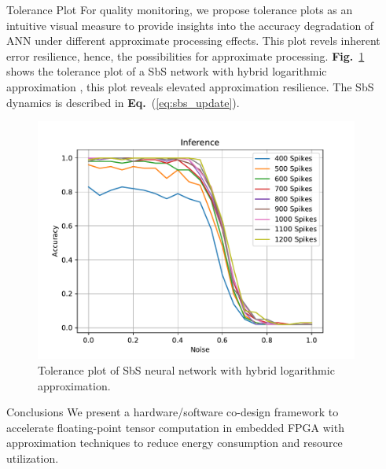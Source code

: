 \documentclass[final]{beamer}
\newlength{\sepwid}
\newlength{\onecolwid}
\newcommand\fig[1]{\textbf{Fig.}~\ref{#1}}
\newcommand\equ[1]{\textbf{Eq.}~(\ref{#1})}
\begin{document}
\begin{frame}[t]
\begin{columns}[t]
\begin{column}{\sepwid}\end{column} %

\begin{column}{\onecolwid} %


\begin{block}{Tolerance Plot}
	For quality monitoring, we propose tolerance plots as an intuitive
	visual measure to provide insights into the accuracy degradation of
	ANN under different approximate processing effects. This plot revels inherent error resilience, hence, the
	possibilities for approximate processing. \fig{fig:tolerance} shows the tolerance plot of a SbS network with hybrid logarithmic approximation \cite{nevarez2021accelerating}, this plot reveals elevated approximation resilience. The SbS dynamics is described in \equ{eq:sbs_update}.
	\begin{figure}
		\includegraphics[width=\linewidth]{../figures/accuracy_vs_spike_log.pdf}
		\caption{Tolerance plot of SbS neural network with hybrid logarithmic approximation.}
		\label{fig:tolerance}
	\end{figure}
\end{block}

\begin{block}{Conclusions}
We present a hardware/software co-design framework to accelerate floating-point tensor computation in embedded FPGA with approximation techniques to reduce energy consumption and resource utilization.


\end{block}
\end{column}
\end{columns}
\end{frame}
\end{document}
